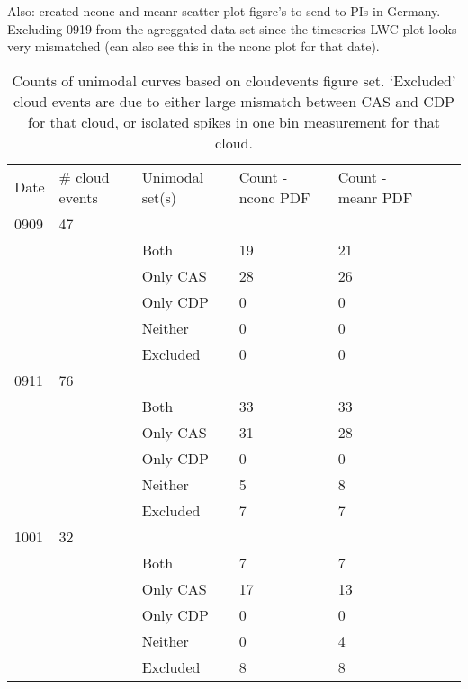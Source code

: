 \documentclass{article}
\begin{document}
\begin{itemize}
Also: created nconc and meanr scatter plot figsrc's to send to PIs in Germany. Excluding 0919 from the agreggated data set since the timeseries LWC plot looks very mismatched (can also see this in the nconc plot for that date). 
\end{itemize}
\begin{table}[ht]
\centering
\begin{tabular}{lllllll}
	Date & \# cloud events & Unimodal set(s) & Count - nconc PDF& Count - meanr PDF\\
0909 & 47                 &                   &                          &                          \\
     &                    & Both     & 19                       & 21                       \\
     &                    & Only CAS & 28                       & 26                       \\
     &                    & Only CDP & 0                        & 0                        \\
     &                    & Neither  & 0                        & 0                        \\
     &                    & Excluded & 0                        & 0                        \\
0911 & 76                 &                   &                          &                          \\
     &                    & Both     & 33                       & 33                       \\
     &                    & Only CAS & 31                       & 28                       \\
     &                    & Only CDP & 0                        & 0                        \\
     &                    & Neither  & 5                        & 8                        \\
     &                    & Excluded & 7                        & 7                        \\
1001 & 32                 &                   &                          &                          \\
     &                    & Both     & 7                        & 7                        \\
     &                    & Only CAS & 17                       & 13                       \\
     &                    & Only CDP & 0                        & 0                        \\
     &                    & Neither  & 0                        & 4                        \\
     &                    & Excluded & 8                        & 8                       
\end{tabular}
\caption{Counts of unimodal curves based on cloudevents figure set. `Excluded' cloud events are due to either large mismatch between CAS and CDP for that cloud, or isolated spikes in one bin measurement for that cloud.}
\label{unimodal}
\end{table}
\end{document}
